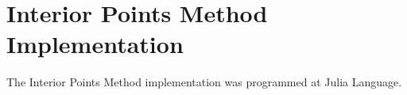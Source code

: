 \documentclass[a4paper]{IEEEtran}
\begin{document}
%


\appendices
\section{Interior Points Method Implementation}
\label{appendix:A}

The Interior Points Method implementation was programmed at Julia Language.
\end{document}
